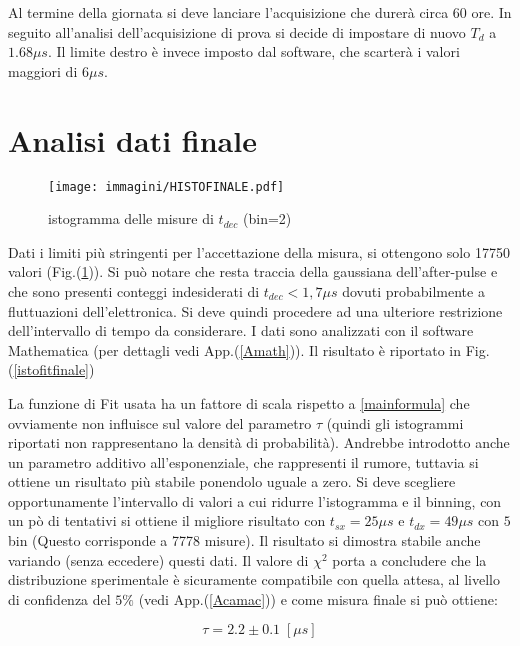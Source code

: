 \documentclass[12pt,a4paper,openright,twoside]{article}
\numberwithin{equation}{section} %
\begin{document}
Al termine della giornata si deve lanciare l'acquisizione che durerà circa 60 ore. In seguito all'analisi dell'acquisizione di prova si decide di impostare di nuovo $T_d$ a $1.68 \mu s$. Il limite destro è invece imposto dal software, che scarterà i valori maggiori di $6 \mu s$.
\bigskip

\section{Analisi dati finale}\label{datifinale}



\begin{figure}[hbtp]
\centering
\texttt{[image: immagini/HISTOFINALE.pdf]}
\caption{istogramma delle misure di $t_{dec}$ (bin=2)}
\label{istofinale}
\end{figure}

Dati i limiti più stringenti per l'accettazione della misura, si ottengono solo 17750 valori (Fig.(\ref{istofinale})).
Si può notare che resta traccia della gaussiana dell'after-pulse e che sono presenti conteggi indesiderati di $t_{dec}<1,7 \mu s$ dovuti probabilmente a fluttuazioni dell'elettronica. Si deve quindi procedere ad una ulteriore restrizione dell'intervallo di tempo da considerare. I dati sono analizzati con il software Mathematica (per dettagli vedi App.(\ref{Amath})). Il risultato è riportato in Fig.(\ref{istofitfinale})

La funzione di Fit usata ha un fattore di scala rispetto a \ref{mainformula} che ovviamente non influisce sul valore del parametro $\tau$ (quindi gli istogrammi riportati non rappresentano la densità di probabilità).
Andrebbe introdotto anche un parametro additivo all'esponenziale, che rappresenti il rumore, tuttavia si ottiene un risultato più stabile ponendolo uguale a zero. Si deve scegliere opportunamente l'intervallo di valori a cui ridurre l'istogramma e il binning, con un pò di tentativi si ottiene il migliore risultato con $t_{sx}=25 \mu s$ e $t_{dx}=49 \mu s$ con $5$ bin (Questo corrisponde a 7778 misure). Il risultato si dimostra stabile anche variando (senza eccedere) questi dati.  Il valore di $\chi ^2$ porta a concludere che la distribuzione sperimentale è sicuramente compatibile con quella attesa, al livello di confidenza del $5 \%$ (vedi App.(\ref{Acamac})) e come misura finale si può ottiene:

\begin{equation}
\boxed{\tau=2.2 \pm 0.1 \;[\mu s]}
\end{equation}
\end{document}
